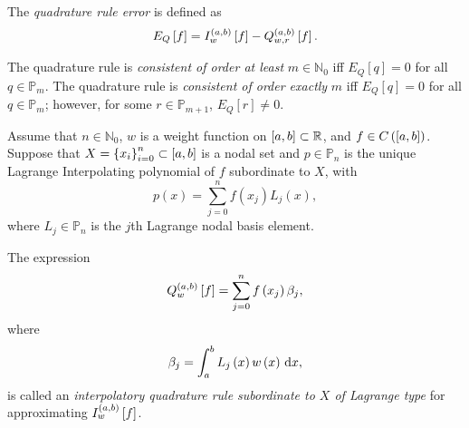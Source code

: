 \begin{frame}

    The \emph{quadrature rule error} is defined as
    \begin{equation*}
        E_{Q}
        \left[f\right]=
        I^{\left(a,b\right)}_{w}
        \left[f\right]-
        Q^{\left(a,b\right)}_{w,r}
        \left[f\right].
    \end{equation*}

    \begin{definition}[consistency]
        The quadrature rule is \emph{consistent of order at least}
        $m\in\mathbb{N}_{0}$ iff $E_{Q}\left[q\right]=0$ for all
        $q\in\mathbb{P}_{m}$.
        The quadrature rule is \emph{consistent of order exactly} $m$
        iff $E_{Q}\left[q\right]=0$ for all $q\in\mathbb{P}_{m}$;
        however, for some $r\in\mathbb{P}_{m+1}$,
        $E_{Q}\left[r\right]\neq 0$.
    \end{definition}

    \begin{definition}
        Assume that $n\in\mathbb{N}_{0}$, $w$ is a weight function on
        $\left[a,b\right]\subset\mathbb{R}$, and $f\in C\left(\left[a,b\right]\right)$.
        Suppose that $X={\left\{x_{i}\right\}}_{i=0}^{n}\subset\left[a,b\right]$ is a nodal set and
        $p\in\mathbb{P}_{n}$ is the unique Lagrange Interpolating
        polynomial of $f$ subordinate to $X$, with
        \begin{equation*}
            p\left(x\right)=
            \sum_{j=0}^{n}
            f\left(x_{j}\right)
            L_{j}\left(x\right),
        \end{equation*}
        where $L_{j}\in\mathbb{P}_{n}$ is the $j$th Lagrange nodal
        basis element.
    \end{definition}
    The expression
    \begin{equation*}
        Q^{\left(a,b\right)}_{w}
        \left[f\right]=
        \sum_{j=0}^{n}
        f\left(x_{j}\right)
        \beta_{j},
    \end{equation*}
    where
    \begin{equation*}
        \beta_{j}=
        \int_{a}^{b}
        L_{j}\left(x\right)
        w\left(x\right)
        \dl x,
    \end{equation*}
    is called an \emph{interpolatory quadrature rule subordinate to $X$ of Lagrange type}
    for approximating
    \begin{math}
        I^{\left(a,b\right)}_{w}
        \left[f\right]
    \end{math}.
\end{frame}

